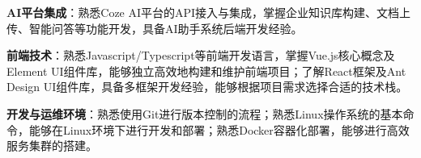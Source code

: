 \item \textbf{AI平台集成}：熟悉Coze AI平台的API接入与集成，掌握企业知识库构建、文档上传、智能问答等功能开发，具备AI助手系统后端开发经验。
\item \textbf{前端技术}：熟悉Javascript/Typescript等前端开发语言，掌握Vue.js核心概念及Element UI组件库，能够独立高效地构建和维护前端项目；了解React框架及Ant Design UI组件库，具备多框架开发经验，能够根据项目需求选择合适的技术栈。
\item \textbf{开发与运维环境}：熟悉使用Git进行版本控制的流程；熟悉Linux操作系统的基本命令，能够在Linux环境下进行开发和部署；熟悉Docker容器化部署，能够进行高效服务集群的搭建。